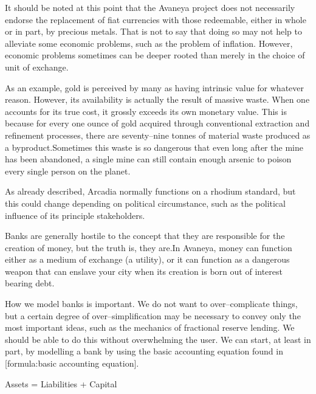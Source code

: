 It should be noted at this point that the Avaneya project does not necessarily endorse the replacement of fiat currencies with those redeemable, either in whole or in part, by precious metals. That is not to say that doing so may not help to alleviate some economic problems, such as the problem of inflation. However, economic problems sometimes can be deeper rooted than merely in the choice of unit of exchange.

As an example, gold is perceived by many as having intrinsic value for whatever reason. However, its availability is actually the result of massive waste. When one accounts for its true cost, it grossly exceeds its own monetary value. This is because for every one ounce of gold acquired through conventional extraction and refinement processes, there are seventy--nine tonnes of material waste produced as a byproduct.\footnotecite[oxfam2004] Sometimes this waste is so dangerous that even long after the mine has been abandoned, a single mine can still contain enough arsenic to poison every single person on the planet.


As already described, Arcadia normally functions on a rhodium standard, but this could change depending on political circumstance, such as the political influence of its principle stakeholders.

Banks are generally hostile to the concept that they are responsible for the creation of money, but the truth is, they are. In Avaneya, money can function either as a medium of exchange (a utility), or it can function as a dangerous weapon that can enslave your city when its creation is born out of interest bearing debt.

How we model banks is important. We do not want to over--complicate things, but a certain degree of over--simplification may be necessary to convey only the most important ideas, such as the mechanics of fractional reserve lending. We should be able to do this without overwhelming the user. We can start, at least in part, by modelling a bank by using the basic accounting equation found in [formula:basic accounting equation].

\crlf
{}
\startformula
Assets = Liabilities + Capital
\stopformula
\crlf

